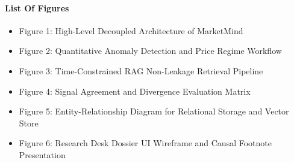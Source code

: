 \documentclass{article}
\begin{document}
	\paragraph{List Of Figures}
	\begin{itemize}
		\item Figure 1: High-Level Decoupled Architecture of MarketMind
		\item Figure 2: Quantitative Anomaly Detection and Price Regime Workflow
		\item Figure 3: Time-Constrained RAG Non-Leakage Retrieval Pipeline
		\item Figure 4: Signal Agreement and Divergence Evaluation Matrix
		\item Figure 5: Entity-Relationship Diagram for Relational Storage and Vector Store
		\item Figure 6: Research Desk Dossier UI Wireframe and Causal Footnote Presentation
	\end{itemize}
\end{document}
